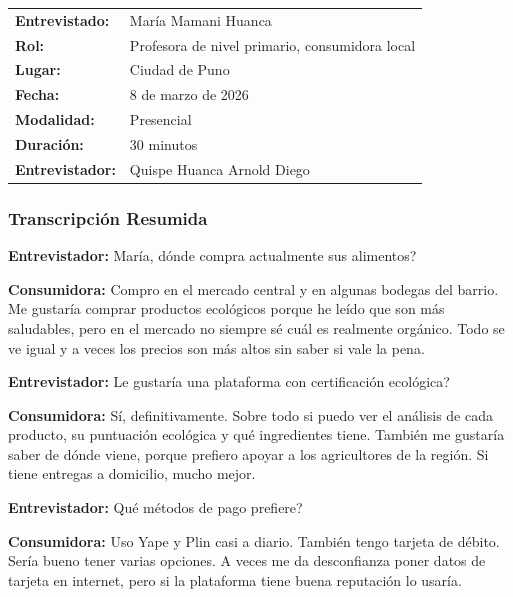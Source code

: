 \documentclass[12pt,a4paper]{article}
\begin{document}
\begin{center}
\begin{tabular}{|L{3.8cm}|L{9.7cm}|}
\hline
{}
 \\
\hline
\textbf{Entrevistado:}  & Mar\'ia Mamani Huanca \\
\hline
\textbf{Rol:}           & Profesora de nivel primario, consumidora local \\
\hline
\textbf{Lugar:}         & Ciudad de Puno \\
\hline
\textbf{Fecha:}         & 8 de marzo de 2026 \\
\hline
\textbf{Modalidad:}     & Presencial \\
\hline
\textbf{Duraci\'on:}    & 30 minutos \\
\hline
\textbf{Entrevistador:} & Quispe Huanca Arnold Diego \\
\hline
\end{tabular}
\end{center}

\subsubsection{Transcripci\'on Resumida}

\textbf{Entrevistador:} Mar\'ia, \textquestiondown d\'onde compra actualmente sus alimentos?

\textbf{Consumidora:} Compro en el mercado central y en algunas bodegas del barrio.
Me gustar\'ia comprar productos ecol\'ogicos porque he le\'ido que son m\'as saludables,
pero en el mercado no siempre s\'e cu\'al es realmente org\'anico. Todo se ve igual y
a veces los precios son m\'as altos sin saber si vale la pena.

\textbf{Entrevistador:} \textquestiondown Le gustar\'ia una plataforma con certificaci\'on ecol\'ogica?

\textbf{Consumidora:} S\'i, definitivamente. Sobre todo si puedo ver el an\'alisis de cada
producto, su puntuaci\'on ecol\'ogica y qu\'e ingredientes tiene. Tambi\'en me gustar\'ia
saber de d\'onde viene, porque prefiero apoyar a los agricultores de la regi\'on. Si
tiene entregas a domicilio, mucho mejor.

\textbf{Entrevistador:} \textquestiondown Qu\'e m\'etodos de pago prefiere?

\textbf{Consumidora:} Uso Yape y Plin casi a diario. Tambi\'en tengo tarjeta de d\'ebito.
Ser\'ia bueno tener varias opciones. A veces me da desconfianza poner datos de
tarjeta en internet, pero si la plataforma tiene buena reputaci\'on lo usar\'ia.
\end{document}
